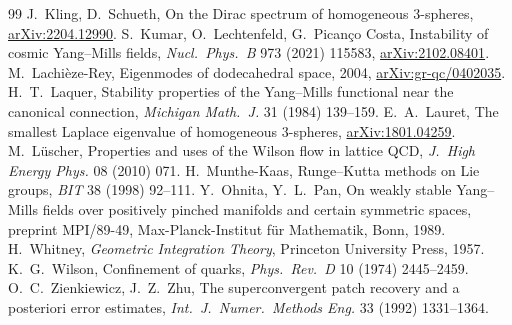 \documentclass[11pt]{article}
\theoremstyle{definition}
\theoremstyle{remark}
\begin{document}
\begin{thebibliography}{99}
 J.~Kling, D.~Schueth, On the Dirac spectrum of homogeneous $3$-spheres, \href{https://arxiv.org/abs/2204.12990}{arXiv:2204.12990}.
 S.~Kumar, O.~Lechtenfeld, G.~Pican\c{c}o Costa, Instability of cosmic Yang--Mills fields, \emph{Nucl.\ Phys.\ B} 973 (2021) 115583, \href{https://arxiv.org/abs/2102.08401}{arXiv:2102.08401}.
 M.~Lachi\`eze-Rey, Eigenmodes of dodecahedral space, 2004, \href{https://arxiv.org/abs/gr-qc/0402035}{arXiv:gr-qc/0402035}.
 H.~T.~Laquer, Stability properties of the Yang--Mills functional near the canonical connection, \emph{Michigan Math.\ J.} 31 (1984) 139--159.
 E.~A.~Lauret, The smallest Laplace eigenvalue of homogeneous $3$-spheres, \href{https://arxiv.org/abs/1801.04259}{arXiv:1801.04259}.
 M.~L\"uscher, Properties and uses of the Wilson flow in lattice QCD, \emph{J.\ High Energy Phys.} 08 (2010) 071.
 H.~Munthe-Kaas, Runge--Kutta methods on Lie groups, \emph{BIT} 38 (1998) 92--111.
 Y.~Ohnita, Y.~L.~Pan, On weakly stable Yang--Mills fields over positively pinched manifolds and certain symmetric spaces, preprint MPI/89-49, Max-Planck-Institut f\"ur Mathematik, Bonn, 1989.
 H.~Whitney, \emph{Geometric Integration Theory}, Princeton University Press, 1957.
 K.~G.~Wilson, Confinement of quarks, \emph{Phys.\ Rev.\ D} 10 (1974) 2445--2459.
 O.~C.~Zienkiewicz, J.~Z.~Zhu, The superconvergent patch recovery and a posteriori error estimates, \emph{Int.\ J.\ Numer.\ Methods Eng.} 33 (1992) 1331--1364.
\end{thebibliography}
\end{document}
